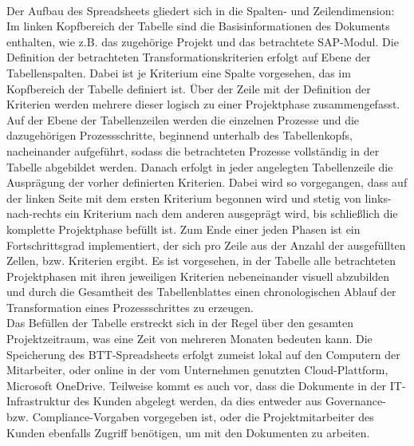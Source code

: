 \\Der Aufbau des Spreadsheets gliedert sich in die Spalten- und Zeilendimension: Im linken Kopfbereich der Tabelle sind die Basisinformationen des Dokuments enthalten, wie z.B. das zugehörige Projekt und das betrachtete SAP-Modul. Die Definition der betrachteten Transformationskriterien erfolgt auf Ebene der Tabellenspalten. Dabei ist je Kriterium eine Spalte vorgesehen, das im Kopfbereich der Tabelle definiert ist. Über der Zeile mit der Definition der Kriterien werden mehrere dieser logisch zu einer Projektphase zusammengefasst. Auf der Ebene der Tabellenzeilen werden die einzelnen Prozesse und die dazugehörigen Prozessschritte, beginnend unterhalb des Tabellenkopfs, nacheinander aufgeführt, sodass die betrachteten Prozesse vollständig in der Tabelle abgebildet werden. Danach erfolgt in jeder angelegten Tabellenzeile die Ausprägung der vorher definierten Kriterien. Dabei wird so vorgegangen, dass auf der linken Seite mit dem ersten Kriterium begonnen wird und stetig von links-nach-rechts ein Kriterium nach dem anderen ausgeprägt wird, bis schließlich die komplette Projektphase befüllt ist. Zum Ende einer jeden Phasen ist ein Fortschrittsgrad implementiert, der sich pro Zeile aus der Anzahl der ausgefüllten Zellen, bzw. Kriterien ergibt. Es ist vorgesehen, in der Tabelle alle betrachteten Projektphasen mit ihren jeweiligen Kriterien nebeneinander visuell abzubilden und durch die Gesamtheit des Tabellenblattes einen chronologischen Ablauf der Transformation eines Prozessschrittes zu erzeugen.\\Das Befüllen der Tabelle erstreckt sich in der Regel über den gesamten Projektzeitraum, was eine Zeit von mehreren Monaten bedeuten kann. Die Speicherung des BTT-Spreadsheets erfolgt zumeist lokal auf den Computern der Mitarbeiter, oder online in der vom Unternehmen genutzten Cloud-Plattform, \glqq{}Microsoft OneDrive\grqq{}. Teilweise kommt es auch vor, dass die Dokumente in der IT-Infrastruktur des Kunden abgelegt werden, da dies entweder aus Governance- bzw. Compliance-Vorgaben vorgegeben ist, oder die Projektmitarbeiter des Kunden ebenfalls Zugriff benötigen, um mit den Dokumenten zu arbeiten.


